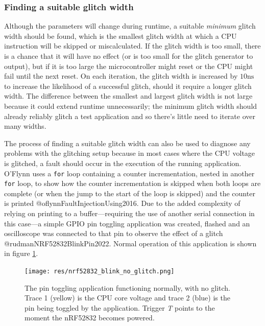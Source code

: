 \hypertarget{finding-a-suitable-glitch-width}{%
\subsubsection{\texorpdfstring{Finding a suitable glitch
width\label{section_nrf52832_suitable_width}}{Finding a suitable glitch width}}\label{finding-a-suitable-glitch-width}}

Although the parameters will change during runtime, a suitable
\emph{minimum} glitch width should be found, which is the smallest
glitch width at which a CPU instruction will be skipped or
miscalculated. If the glitch width is too small, there is a chance that
it will have no effect (or is too small for the glitch generator to
output), but if it is too large the microcontroller might reset or the
CPU might fail until the next reset. On each iteration, the glitch width
is increased by \(10\si{\nano\second}\) to increase the likelihood of a
successful glitch, should it require a longer glitch width. The
difference between the smallest and largest glitch width is not large
because it could extend runtime unnecessarily; the minimum glitch width
should already reliably glitch a test application and so there's little
need to iterate over many widths.

The process of finding a suitable glitch width can also be used to
diagnose any problems with the glitching setup because in most cases
where the CPU voltage is glitched, a fault should occur in the execution
of the running application. O'Flynn uses a \texttt{for} loop containing
a counter incrementation, nested in another \texttt{for} loop, to show
how the counter incrementation is skipped when both loops are complete
(or when the jump to the start of the loop is skipped) and the counter
is printed @oflynnFaultInjectionUsing2016. Due to the added complexity
of relying on printing to a buffer---requiring the use of another serial
connection in this case---a simple GPIO pin toggling application was
created, flashed and an oscilloscope was connected to that pin to
observe the effect of a glitch @rudmanNRF52832BlinkPin2022. Normal
operation of this application is shown in figure
\ref{img_nrf52832_blink_no_glitch}.

\begin{figure}
\centering
\texttt{[image: res/nrf52832\_blink\_no\_glitch.png]}
\caption{The pin toggling application functioning normally, with no
glitch. Trace 1 (yellow) is the CPU core voltage and trace 2 (blue) is
the pin being toggled by the application. Trigger \emph{T} points to the
moment the nRF52832 becomes
powered.\label{img_nrf52832_blink_no_glitch}}
\end{figure}

